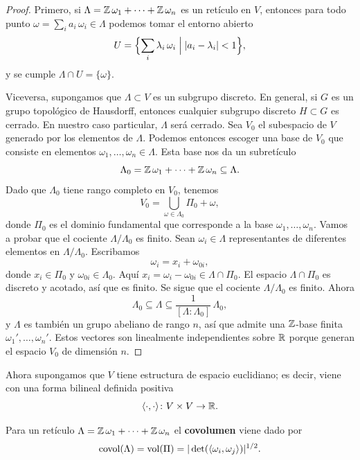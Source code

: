 \begin{proof}
  Primero, si $\Lambda = \mathbb{Z}\,\omega_1 + \cdots + \mathbb{Z}\,\omega_n$ es un retículo en
  $V$, entonces para todo punto $\omega = \sum_i a_i\,\omega_i \in \Lambda$
  podemos tomar el entorno abierto
  $$U = \Bigl\{ \sum_i \lambda_i\,\omega_i \Bigm| |a_i - \lambda_i| < 1 \Bigr\},$$
  y se cumple $\Lambda \cap U = \{ \omega \}$.

  Viceversa, supongamos que $\Lambda \subset V$ es un subgrupo discreto.
  En general, si $G$ es un grupo topológico de Hausdorff, entonces cualquier
  subgrupo discreto $H \subset G$ es cerrado. En nuestro caso particular,
  $\Lambda$ será cerrado. Sea $V_0$ el subespacio de $V$ generado por los
  elementos de $\Lambda$. Podemos entonces escoger una base de $V_0$ que
  consiste en elementos $\omega_1,\ldots,\omega_n \in \Lambda$. Esta base nos da
  un subretículo
  $$\Lambda_0 = \mathbb{Z}\,\omega_1 + \cdots + \mathbb{Z}\,\omega_n \subseteq \Lambda.$$
  Dado que $\Lambda_0$ tiene rango completo en $V_0$, tenemos
  $$V_0 = \bigcup_{\omega \in \Lambda_0} \Pi_0 + \omega,$$
  donde $\Pi_0$ es el dominio fundamental que corresponde a la base
  $\omega_1,\ldots,\omega_n$. Vamos a probar que el cociente $\Lambda/\Lambda_0$
  es finito. Sean $\omega_i \in \Lambda$ representantes de diferentes elementos
  en $\Lambda/\Lambda_0$. Escribamos
  $$\omega_i = x_i + \omega_{0i},$$
  donde $x_i \in \Pi_0$ y $\omega_{0i} \in \Lambda_0$. Aquí
  $x_i = \omega_i - \omega_{0i} \in \Lambda \cap \Pi_0$. El espacio
  $\Lambda \cap \Pi_0$ es discreto y acotado, así que es finito. Se sigue que
  el cociente $\Lambda/\Lambda_0$ es finito. Ahora
  $$\Lambda_0 \subseteq \Lambda \subseteq \frac{1}{[\Lambda : \Lambda_0]}\,\Lambda_0,$$
  y $\Lambda$ es también un grupo abeliano de rango $n$, así que admite una
  $\mathbb{Z}$-base finita $\omega_1', \ldots, \omega_n'$. Estos vectores son
  linealmente independientes sobre $\mathbb{R}$ porque generan el espacio $V_0$ de
  dimensión $n$.
\end{proof}

Ahora supongamos que $V$ tiene estructura de espacio euclidiano; es decir, viene
con una forma bilineal definida positiva
$$\langle\cdot,\cdot\rangle\colon V\times V \to \mathbb{R}.$$

\begin{definicion}
  Para un retículo $\Lambda = \mathbb{Z}\,\omega_1 + \cdots + \mathbb{Z}\,\omega_n$ el
  \textbf{covolumen} viene dado por
  $$\operatorname{covol} (\Lambda) = \operatorname{vol} (\Pi) = |\det (\langle\omega_i,\omega_j\rangle)|^{1/2}.$$
\end{definicion}

